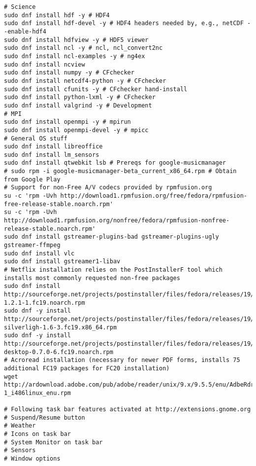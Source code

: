 \documentclass[12pt,twoside]{article}
\begin{document}
\begin{verbatim}
# Science
sudo dnf install hdf -y # HDF4
sudo dnf install hdf-devel -y # HDF4 headers needed by, e.g., netCDF --enable-hdf4
sudo dnf install hdfview -y # HDF5 viewer
sudo dnf install ncl -y # ncl, ncl_convert2nc
sudo dnf install ncl-examples -y # ng4ex
sudo dnf install ncview
sudo dnf install numpy -y # CFchecker
sudo dnf install netcdf4-python -y # CFchecker
sudo dnf install cfunits -y # CFchecker hand-install
sudo dnf install python-lxml -y # CFchecker
sudo dnf install valgrind -y # Development
# MPI
sudo dnf install openmpi -y # mpirun
sudo dnf install openmpi-devel -y # mpicc
# General OS stuff
sudo dnf install libreoffice
sudo dnf install lm_sensors
sudo dnf install qtwebkit lsb # Prereqs for google-musicmanager
# sudo rpm -i google-musicmanager-beta_current_x86_64.rpm # Obtain from Google Play
# Support for non-Free A/V codecs provided by rpmfusion.org
su -c 'rpm -Uvh http://download1.rpmfusion.org/free/fedora/rpmfusion-free-release-stable.noarch.rpm'
su -c 'rpm -Uvh http://download1.rpmfusion.org/nonfree/fedora/rpmfusion-nonfree-release-stable.noarch.rpm'
sudo dnf install gstreamer-plugins-bad gstreamer-plugins-ugly gstreamer-ffmpeg
sudo dnf install vlc
sudo dnf install gstreamer1-libav
# Netflix installation relies on the PostInstallerF tool which installs most commonly requested non-free packages
sudo dnf install http://sourceforge.net/projects/postinstaller/files/fedora/releases/19/x86_64/updates/postinstallerf-1.2.1-1.fc19.noarch.rpm 
sudo dnf -y install http://sourceforge.net/projects/postinstaller/files/fedora/releases/19/x86_64/updates/wine-silverligh-1.6-3.fc19.x86_64.rpm
sudo dnf -y install http://sourceforge.net/projects/postinstaller/files/fedora/releases/19/x86_64/updates/netflix-desktop-0.7.0-6.fc19.noarch.rpm
# Acroread installation (necessary for newer PDF forms, installs 75 additional FC19 packages for FC20 installation)
wget http://ardownload.adobe.com/pub/adobe/reader/unix/9.x/9.5.5/enu/AdbeRdr9.5.5-1_i486linux_enu.rpm

# Following task bar features activated at http://extensions.gnome.org
# Suspend/Resume button
# Weather
# Icons on task bar
# System Monitor on task bar
# Sensors
# Window options
\end{verbatim}
\end{document}
